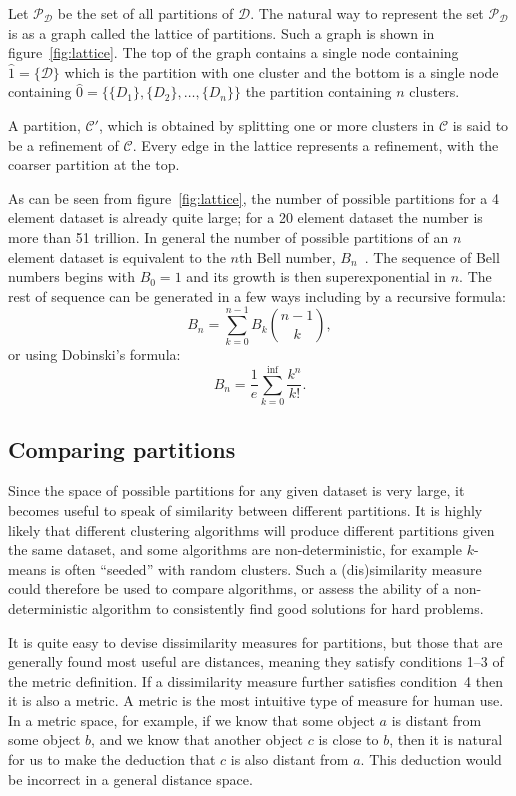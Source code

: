 \documentclass[a4paper]{report}
\newcommand{\dset}{\mathcal{D}}
\newcommand{\clus}{\mathcal{C}}
\begin{document}
Let $\mathcal{P}_{\dset}$ be the set of all partitions of $\dset$.  The
natural way to represent the set $\mathcal{P}_{\dset}$ is as a graph called
the lattice of partitions.  Such a graph is shown in figure~\ref{fig:lattice}.
The top of the graph contains a single node containing $\hat{1} = \{\dset\}$
which is the partition with one cluster and the bottom is a single node
containing $\hat{0} = \{\{D_1\},\{D_2\},\dotsc,\{D_n\}\}$ the partition
containing $n$ clusters.

A partition, $\clus'$, which is obtained by splitting one or more clusters in
$\clus$ is said to be a refinement of $\clus$.  Every edge in the lattice
represents a refinement, with the coarser partition at the top.

As can be seen from figure~\ref{fig:lattice}, the number of possible
partitions for a 4 element dataset is already quite large; for a 20 element
dataset the number is more than 51 trillion.  In general the number of
possible partitions of an $n$ element dataset is equivalent to the $n$th Bell
number, $B_n$~\citep{bell1934exponential}.  The sequence of Bell numbers
begins with $B_0 = 1$ and its growth is then superexponential in $n$.  The
rest of sequence can be generated in a few ways including by a recursive
formula:
\begin{equation*}
  B_n = \sum_{k=0}^{n-1} B_k {n-1 \choose k},
\end{equation*}
or using Dobinski's formula:
\begin{equation*}
  B_n = \frac{1}{e} \sum_{k=0}^{\inf} \frac{k^n}{k!}.
\end{equation*}

\subsection{Comparing partitions}
\label{sec:comparing-partitions}

Since the space of possible partitions for any given dataset is very large, it
becomes useful to speak of similarity between different partitions.  It is
highly likely that different clustering algorithms will produce different
partitions given the same dataset, and some algorithms are non-deterministic,
for example $k$-means is often ``seeded'' with random clusters.  Such a
(dis)similarity measure could therefore be used to compare algorithms, or
assess the ability of a non-deterministic algorithm to consistently find good
solutions for hard problems.

It is quite easy to devise dissimilarity measures for partitions, but those
that are generally found most useful are distances, meaning they satisfy
conditions 1--3 of the metric definition.  If a dissimilarity measure further
satisfies condition~4 then it is also a metric.  A metric is the most
intuitive type of measure for human use.  In a metric space, for example, if
we know that some object $a$ is distant from some object $b$, and we know that
another object $c$ is close to $b$, then it is natural for us to make the
deduction that $c$ is also distant from $a$.  This deduction would be
incorrect in a general distance space.
\end{document}
